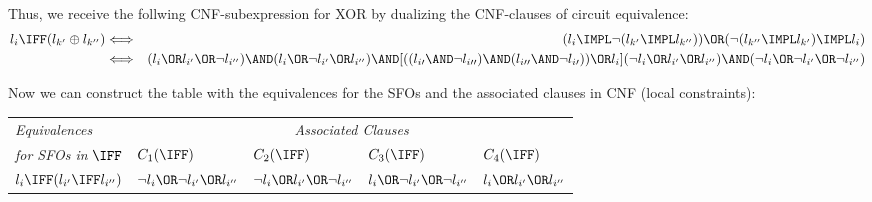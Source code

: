 {\begin{enumerate}
	Thus, we receive the follwing CNF-subexpression for \textrm{XOR} by
	dualizing the CNF-clauses of circuit equivalence:%
	\begin{eqnarray*}
	l_{i}\IFF(l_{k^{\prime }}\oplus l_{k^{\prime \prime }}) &\Longleftrightarrow
	&(l_{i}\IMPL\lnot (l_{k^{\prime }}\IMPL l_{k^{\prime \prime }}))\OR(\lnot
	(l_{k^{\prime \prime }}\IMPL l_{k^{\prime }})\IMPL l_{i}) \\
	&\Longleftrightarrow &(l_{i}\OR l_{i^{\prime }}\OR\lnot l_{i^{\prime \prime
	}})\AND(l_{i}\OR\lnot l_{i^{\prime }}\OR l_{i^{\prime \prime }})\AND
	[((l_{i\prime} \AND\neg l_{i\prime\prime}) \AND (l_{i\prime\prime} \AND\neg
	l_{i\prime})) \OR l_{i}](\lnot l_{i}\OR l_{i^{\prime }}\OR l_{i^{\prime
	\prime }})\AND(\lnot l_{i}\OR\lnot l_{i^{\prime }}\OR\lnot l_{i^{\prime
	\prime }})
	\end{eqnarray*}
	\end{enumerate}

	Now we can construct the table with the equivalences for the SFOs and the
	associated clauses in CNF (local constraints):

	\begin{tabular}{|l|l|l|l|l|}
	\hline
	\textsl{\small Equivalences} & \multicolumn{4}{c|}{\textsl{\small Associated
	Clauses}} \\ 
	{\small \textsl{for SFOs in} $\IFF$} & $C_{1}(\IFF)$ & $C_{2}(\IFF)$ & $%
	C_{3}(\IFF)$ & $C_{4}(\IFF)$ \\ \hline
	$l_{i}\IFF(l_{i^{\prime }}\IFF l_{i^{\prime \prime }})$ & $\lnot l_{i}\OR%
	\lnot l_{i^{\prime }}\OR l_{i^{\prime \prime }}$ & $\lnot l_{i}\OR %
	l_{i^{\prime }}\OR\lnot l_{i^{\prime \prime }}$ & $l_{i}\OR\lnot
	l_{i^{\prime }}\OR\lnot l_{i^{\prime \prime }}$ & $l_{i}\OR l_{i^{\prime }}%
	\OR l_{i^{\prime \prime }}$ \\ \hline
	\end{tabular}
	\label{tab:translation_cnf}

	\bigskip 
}